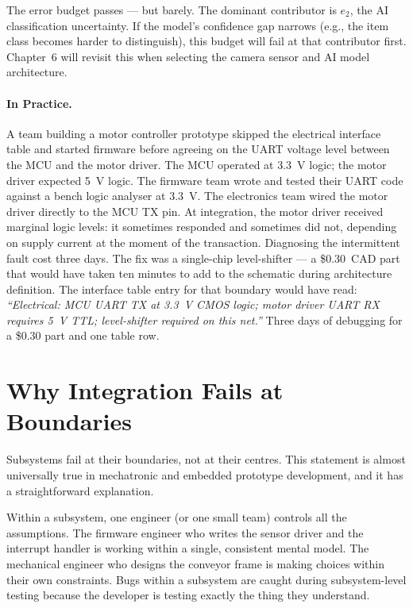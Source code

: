 The error budget passes --- but barely.
The dominant contributor is $e_2$, the AI classification uncertainty.
If the model's confidence gap narrows (e.g., the item class becomes harder to distinguish), this budget will fail at that contributor first.
Chapter~6 will revisit this when selecting the camera sensor and AI model architecture.

\paragraph{In Practice.}
A team building a motor controller prototype skipped the electrical interface table and started firmware before agreeing on the UART voltage level between the MCU and the motor driver.
The MCU operated at 3.3~V logic; the motor driver expected 5~V logic.
The firmware team wrote and tested their UART code against a bench logic analyser at 3.3~V.
The electronics team wired the motor driver directly to the MCU TX pin.
At integration, the motor driver received marginal logic levels: it sometimes responded and sometimes did not, depending on supply current at the moment of the transaction.
Diagnosing the intermittent fault cost three days.
The fix was a single-chip level-shifter --- a \$0.30~CAD part that would have taken ten minutes to add to the schematic during architecture definition.
The interface table entry for that boundary would have read: \emph{``Electrical: MCU UART TX at 3.3~V CMOS logic; motor driver UART RX requires 5~V TTL; level-shifter required on this net.''}
Three days of debugging for a \$0.30 part and one table row.

\section{Why Integration Fails at Boundaries}
\label{sec:ch5-failures}

Subsystems fail at their boundaries, not at their centres.
This statement is almost universally true in mechatronic and embedded prototype development, and it has a straightforward explanation.

Within a subsystem, one engineer (or one small team) controls all the assumptions.
The firmware engineer who writes the sensor driver and the interrupt handler is working within a single, consistent mental model.
The mechanical engineer who designs the conveyor frame is making choices within their own constraints.
Bugs within a subsystem are caught during subsystem-level testing because the developer is testing exactly the thing they understand.

